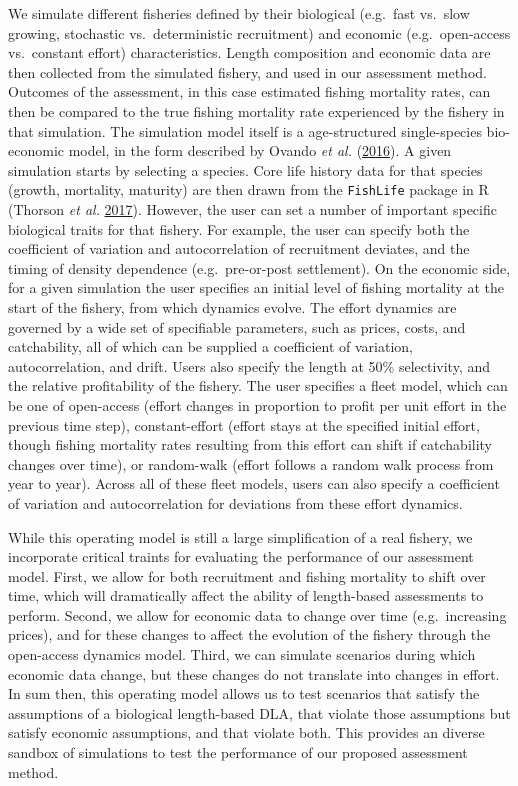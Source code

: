 \documentclass[twoside,12pt,final]{ucthesis-CA2012}
\begin{document}
\begin{ucmainmatter}
We simulate different fisheries defined by their biological (e.g.~fast
vs.~slow growing, stochastic vs.~deterministic recruitment) and economic
(e.g.~open-access vs.~constant effort) characteristics. Length
composition and economic data are then collected from the simulated
fishery, and used in our assessment method. Outcomes of the assessment,
in this case estimated fishing mortality rates, can then be compared to
the true fishing mortality rate experienced by the fishery in that
simulation. The simulation model itself is a age-structured
single-species bio-economic model, in the form described by Ovando
\emph{et al.} (\protect\hyperlink{ref-Ovando2016a}{2016}). A given
simulation starts by selecting a species. Core life history data for
that species (growth, mortality, maturity) are then drawn from the
\texttt{FishLife} package in R (Thorson \emph{et al.}
\protect\hyperlink{ref-Thorson2017d}{2017}). However, the user can set a
number of important specific biological traits for that fishery. For
example, the user can specify both the coefficient of variation and
autocorrelation of recruitment deviates, and the timing of density
dependence (e.g.~pre-or-post settlement). On the economic side, for a
given simulation the user specifies an initial level of fishing
mortality at the start of the fishery, from which dynamics evolve. The
effort dynamics are governed by a wide set of specifiable parameters,
such as prices, costs, and catchability, all of which can be supplied a
coefficient of variation, autocorrelation, and drift. Users also specify
the length at 50\% selectivity, and the relative profitability of the
fishery. The user specifies a fleet model, which can be one of
open-access (effort changes in proportion to profit per unit effort in
the previous time step), constant-effort (effort stays at the specified
initial effort, though fishing mortality rates resulting from this
effort can shift if catchability changes over time), or random-walk
(effort follows a random walk process from year to year). Across all of
these fleet models, users can also specify a coefficient of variation
and autocorrelation for deviations from these effort dynamics.

While this operating model is still a large simplification of a real
fishery, we incorporate critical traints for evaluating the performance
of our assessment model. First, we allow for both recruitment and
fishing mortality to shift over time, which will dramatically affect the
ability of length-based assessments to perform. Second, we allow for
economic data to change over time (e.g.~increasing prices), and for
these changes to affect the evolution of the fishery through the
open-access dynamics model. Third, we can simulate scenarios during
which economic data change, but these changes do not translate into
changes in effort. In sum then, this operating model allows us to test
scenarios that satisfy the assumptions of a biological length-based DLA,
that violate those assumptions but satisfy economic assumptions, and
that violate both. This provides an diverse sandbox of simulations to
test the performance of our proposed assessment method.


\end{ucmainmatter}
\end{document}
